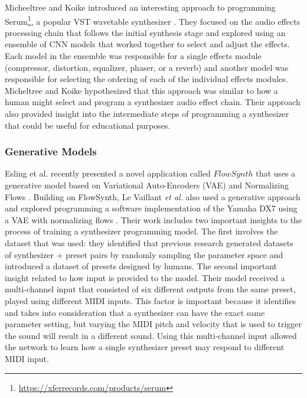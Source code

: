 Micheeltree and Koike introduced an interesting approach to programming Serum\footnote{\url{https://xferrecords.com/products/serum}}, a popular VST wavetable synthesizer \cite{mitcheltree2021serumrnn}. They focused on the audio effects processing chain that follows the initial synthesis stage and explored using an ensemble of CNN models that worked together to select and adjust the effects. Each model in the ensemble was responsible for a single effects module (compressor, distortion, equalizer, phaser, or a reverb) and another model was responsible for selecting the ordering of each of the individual effects modules. Micheltree and Koike hypothesized that this approach was similar to how a human might select and program a synthesizer audio effect chain. Their approach also provided insight into the intermediate steps of programming a synthesizer that could be useful for educational purposes.

\subsubsection{Generative Models}
Esling et al. recently presented a novel application called $FlowSynth$ that uses a generative model based on Variational Auto-Encoders (VAE) and Normalizing Flows \cite{esling2020flow}. Building on FlowSynth, Le Vaillant \textit{et al.} also used a generative approach and explored programming a software implementation of the Yamaha DX7 using a VAE with normalizing flows \cite{le2021improving}. Their work includes two important insights to the process of training a synthesizer programming model. The first involves the dataset that was used: they identified that previous research generated datasets of synthesizer + preset pairs by randomly sampling the parameter space and introduced a dataset of presets designed by humans. The second important insight related to how input is provided to the model. Their model received a multi-channel input that consisted of six different outputs from the same preset, played using different MIDI inputs. This factor is important because it identifies and takes into consideration that a synthesizer can have the exact same parameter setting, but varying the MIDI pitch and velocity that is used to trigger the sound will result in a different sound. Using this multi-channel input allowed the network to learn how a single synthesizer preset may respond to different MIDI input.

